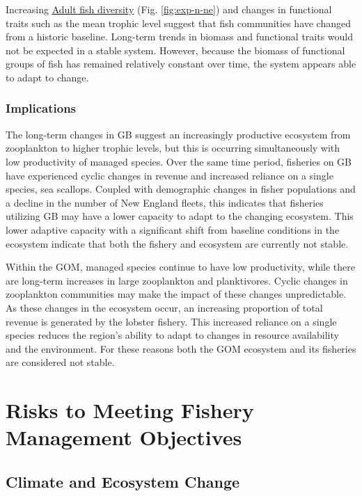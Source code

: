 \documentclass[
  10pt,
]{article}
\begin{document}
Increasing \href{https://noaa-edab.github.io/catalog/exp_n.html}{Adult fish diversity} (Fig. \ref{fig:exp-n-ne}) and changes in functional traits such as the mean trophic level suggest that fish communities have changed from a historic baseline. Long-term trends in biomass and functional traits would not be expected in a stable system. However, because the biomass of functional groups of fish has remained relatively constant over time, the system appears able to adapt to change.

\subsubsection{Implications}\label{implications-10}

The long-term changes in GB suggest an increasingly productive ecosystem from zooplankton to higher trophic levels, but this is occurring simultaneously with low productivity of managed species. Over the same time period, fisheries on GB have experienced cyclic changes in revenue and increased reliance on a single species, sea scallops. Coupled with demographic changes in fisher populations and a decline in the number of New England fleets, this indicates that fisheries utilizing GB may have a lower capacity to adapt to the changing ecosystem. This lower adaptive capacity with a significant shift from baseline conditions in the ecosystem indicate that both the fishery and ecosystem are currently not stable.

Within the GOM, managed species continue to have low productivity, while there are long-term increases in large zooplankton and planktivores. Cyclic changes in zooplankton communities may make the impact of these changes unpredictable. As these changes in the ecosystem occur, an increasing proportion of total revenue is generated by the lobster fishery. This increased reliance on a single species reduces the region's ability to adapt to changes in resource availability and the environment. For these reasons both the GOM ecosystem and its fisheries are considered not stable.

\newpage

\section{Risks to Meeting Fishery Management Objectives}\label{risks-to-meeting-fishery-management-objectives}

\subsection{Climate and Ecosystem Change}\label{climate-and-ecosystem-change}
\end{document}
